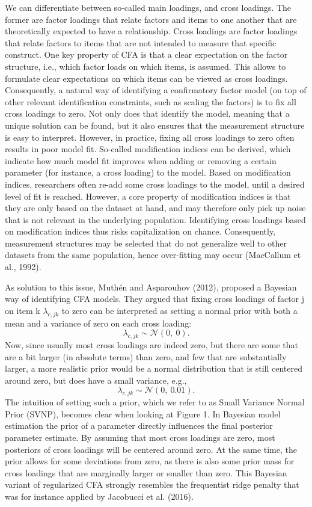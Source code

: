 \documentclass[
  man, donotrepeattitle,floatsintext]{apa6}
\begin{document}
We can differentiate between so-called main loadings, and cross
loadings. The former are factor loadings that relate factors and items
to one another that are theoretically expected to have a relationship.
Cross loadings are factor loadings that relate factors to items that are
not intended to measure that specific construct. One key property of CFA
is that a clear expectation on the factor structure, i.e., which factor
loads on which items, is assumed. This allows to formulate clear
expectations on which items can be viewed as cross loadings.
Consequently, a natural way of identifying a confirmatory factor model
(on top of other relevant identification constraints, such as scaling
the factors) is to fix all cross loadings to zero. Not only does that
identify the model, meaning that a unique solution can be found, but it
also ensures that the measurement structure is easy to interpret.
However, in practice, fixing all cross loadings to zero often results in
poor model fit. So-called modification indices can be derived, which
indicate how much model fit improves when adding or removing a certain
parameter (for instance, a cross loading) to the model. Based on
modification indices, researchers often re-add some cross loadings to
the model, until a desired level of fit is reached. However, a core
property of modification indices is that they are only based on the
dataset at hand, and may therefore only pick up noise that is not
relevant in the underlying population. Identifying cross loadings based
on modification indices thus risks capitalization on chance.
Consequently, measurement structures may be selected that do not
generalize well to other datasets from the same population, hence
over-fitting may occur (MacCallum et al., 1992).

As solution to this issue, Muthén and Asparouhov (2012), proposed a Bayesian
way of identifying CFA models. They argued that fixing cross loadings of
factor j on item k \(\lambda_{c,jk}\) to zero can be interpreted as
setting a normal prior with both a mean and a variance of zero on each
cross loading: \[\lambda_{c,jk}  \sim \mathcal{N}(0, \ 0).\] Now, since
usually most cross loadings are indeed zero, but there are some that are
a bit larger (in absolute terms) than zero, and few that are
substantially larger, a more realistic prior would be a normal
distribution that is still centered around zero, but does have a small
variance, e.g.,\\
\[\lambda_{c,jk}  \sim \mathcal{N}(0, \ 0.01).\] The intuition of
setting such a prior, which we refer to as Small Variance Normal Prior
(SVNP), becomes clear when looking at Figure 1. In Bayesian model
estimation the prior of a parameter directly influences the final
posterior parameter estimate. By assuming that most cross loadings are
zero, most posteriors of cross loadings will be centered around zero. At
the same time, the prior allows for some deviations from zero, as there
is also some prior mass for cross loadings that are marginally larger or
smaller than zero. This Bayesian variant of regularized CFA strongly
resembles the frequentist ridge penalty that was for instance applied by
Jacobucci et al. (2016).
\end{document}
